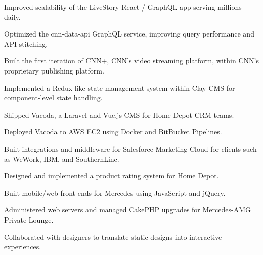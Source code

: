 \documentclass[]{pb-resume}
\begin{document}
\begin{minipage}[t]{0.66\textwidth}
\vspace{0pt} %
\begin{tightemize}
\item Improved scalability of the LiveStory React / GraphQL app serving millions daily.
\item Optimized the cnn-data-api GraphQL service, improving query performance and API stitching.
\item Built the first iteration of CNN+, CNN's video streaming platform, within CNN's proprietary publishing platform.
\item Implemented a Redux-like state management system within Clay CMS for component-level state handling.
\end{tightemize}
\sectionsep

\vspace{0pt} %
\begin{tightemize}
\item Shipped Vacoda, a Laravel and Vue.js CMS for Home Depot CRM teams.
\item Deployed Vacoda to AWS EC2 using Docker and BitBucket Pipelines.
\item Built integrations and middleware for Salesforce Marketing Cloud for clients such as WeWork, IBM, and SouthernLinc.
\item Designed and implemented a product rating system for Home Depot.
\end{tightemize}  
\sectionsep

\vspace{0pt} %
\begin{tightemize}
\item Built mobile/web front ends for Mercedes using JavaScript and jQuery.
\item Administered web servers and managed CakePHP upgrades for Mercedes-AMG Private Lounge.
\item Collaborated with designers to translate static designs into interactive experiences.
\end{tightemize}
\sectionsep

\end{minipage} 
\end{document}
